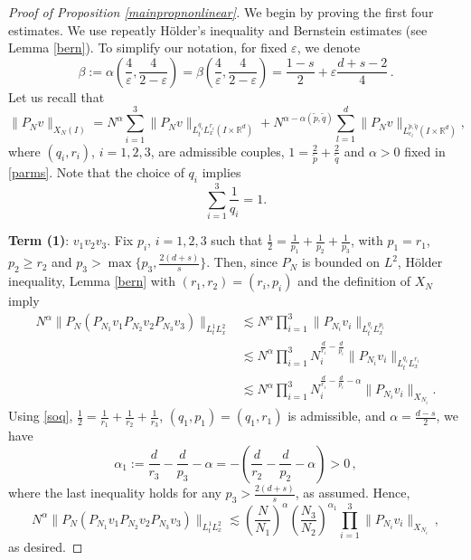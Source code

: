\documentclass[10pt,leqno]{amsart}
\newcommand{\R}{\mathbb{R}}
\numberwithin{equation}{section}
\begin{document}
\begin{proof}[Proof of Proposition \ref{mainpropnonlinear}]
We begin by proving the first four estimates. We use repeatly H\" older's inequality and Bernstein estimates (see Lemma \ref{bern}). To simplify our notation, for fixed $\varepsilon$, we
 denote 
$$
\beta := \alpha \left( \frac{4}{\varepsilon}, \frac{4}{2-\varepsilon}\right) =  \beta \left(\frac{4}{\varepsilon}, \frac{4}{2-\varepsilon}\right) = \dfrac{1-s}{2}+\varepsilon \dfrac{d+s-2}{4} \,.
$$
Let us recall that
$$\|P_N v\|_{X_N (I)}= N^\alpha \sum_{i=1}^{3} \|P_N v\|_{L_t^{q_i} L_x^{r_i} (I\times \R^d)} +N^{\alpha-\alpha(\tilde{p},\tilde{q}) } \sum_{l=1}^d \|P_N v \|_{L_{e_l}^{\tilde{p},\tilde{q} } (I\times \R^d)},$$
where $(q_i ,r_i)$, $i=1,2,3$, are admissible couples, $1= \frac{2}{\tilde{p}} +\frac{2}{\tilde{q}}$ and $\alpha>0$ fixed in \eqref{parms}. Note that the choice of $q_i$ implies 
\begin{equation}\label{soq}
\sum_{i=1}^3 \dfrac{1}{q_i}=1. 
\end{equation}



\textbf{Term (1)}: $v_1 v_2 v_3$. 
Fix $p_i$, $i = 1, 2, 3$ such that $\frac{1}{2}=\frac{1}{p_1}+\frac{1}{p_2} +\frac{1}{p_3} $, with $p_1=r_1$, $p_2 \geq r_2$ and $p_3 > \max\{p_3, \frac{2(d + s)}{s} \}$. 
Then, since $P_N$ is bounded on $L^2$, H\" older
inequality,  Lemma \ref{bern} with $(r_1, r_2) = (r_i, p_i)$ and the definition of $X_N$ imply
\begin{align*}
N^\alpha \|P_N (P_{N_1} v_1  P_{N_2} v_2 P_{N_3} v_3) \|_{L_t^{1} L_x^{2}} &\lesssim N^\alpha \prod_{i=1}^3 \|P_{N_i} v_i \|_{L_t^{q_i}L_x^{p_i}} \\
&\lesssim N^\alpha \prod_{i=1}^3 N_i^{\frac{d}{r_i}- \frac{d}{p_i}} \|P_{N_i} v_i \|_{L_t^{q_i}L_x^{r_i}} \\
&\lesssim N^\alpha \prod_{i=1}^3 N_i^{\frac{d}{r_i}- \frac{d}{p_i} -\alpha } \|P_{N_i} v_i\|_{X_{N_i}}  .
\end{align*}
Using \eqref{soq}, $\frac{1}{2} = \frac{1}{r_1} + \frac{1}{r_2} + \frac{1}{r_3}$, $(q_1,p_1) = (q_1, r_1)$ is admissible, and $\alpha =\frac{d-s}{2}$, we have
$$\alpha_1 :=  \frac{d}{ r_3} - \frac{d}{p_3} -\alpha = -\left(\frac{d}{ r_2}- \frac{d}{p_2} -\alpha\right) > 0 \,,$$
where the last inequality holds for any $p_3 > \frac{2(d + s)}{s}$, as  assumed. 
Hence,
$$N^\alpha \|P_N (P_{N_1} v_1  P_{N_2} v_2 P_{N_3} v_3) \|_{L_t^{1} L_x^{2}} \lesssim \left(\frac{N}{N_1}\right)^\alpha \left(\frac{N_3}{N_2}\right)^{\alpha_1} \prod_{i=1}^3 \|P_{N_i} v_i \|_{X_{N_i}} \,,$$
as desired.



\end{proof}
\end{document}
